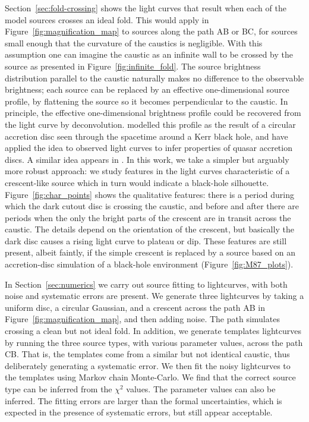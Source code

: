 \documentclass[usenatbib]{mn2e}
\begin{document}
Section~\ref{sec:fold-crossing} shows the light curves that result
when each of the model sources crosses an ideal fold.  This would
apply in Figure~\ref{fig:magnification_map} to sources along the path
AB or BC, for sources small enough that the curvature of the caustics
is negligible.  With this assumption one can imagine the caustic as an
infinite wall to be crossed by the source as presented in
Figure~\ref{fig:infinite_fold}.  The source brightness distribution
parallel to the caustic naturally makes no difference to the
observable brightness; each source can be replaced by an effective
one-dimensional source profile, by flattening the source so it becomes
perpendicular to the caustic.  In principle, the effective
one-dimensional brightness profile could be recovered from the light
curve by deconvolution.  \cite{1999ApJ...524...49A} modelled this
profile as the result of a circular accretion disc seen through the
spacetime around a Kerr black hole, and \cite{2012MNRAS.423..676A}
have applied the idea to observed light curves to infer properties of
quasar accretion discs.  A similar idea appears in
\cite{2013ApJ...769..131C}.  In this work, we take a simpler but
arguably more robust approach: we study features in the light curves
characteristic of a crescent-like source which in turn would indicate
a black-hole silhouette.  Figure~\ref{fig:char_points} shows the
qualitative features: there is a period during which the dark cutout
disc is crossing the caustic, and before and after there are periods
when the only the bright parts of the crescent are in transit across
the caustic.  The details depend on the orientation of the crescent,
but basically the dark disc causes a rising light curve to plateau or
dip.  These features are still present, albeit faintly, if the simple
crescent is replaced by a source based on an accretion-disc simulation
of a black-hole environment (Figure~\ref{fig:M87_plots}).


In Section~\ref{sec:numerics} we carry out source fitting to
lightcurves, with both noise and systematic errors are present.  We
generate three lightcurves by taking a uniform disc, a circular
Gaussian, and a crescent across the path AB in
Figure~\ref{fig:magnification_map}, and then adding noise.  The path
simulates crossing a clean but not ideal fold.  In addition, we
generate templates lightcurves by running the three source types, with
various parameter values, across the path CB.  That is, the templates
come from a similar but not identical caustic, thus deliberately
generating a systematic error.  We then fit the noisy lightcurves to
the templates using Markov chain Monte-Carlo.  We find that the
correct source type can be inferred from the $\chi^2$ values.  The
parameter values can also be inferred. The fitting errors are larger
than the formal uncertainties, which is expected in the presence of
systematic errors, but still appear acceptable.
\end{document}
